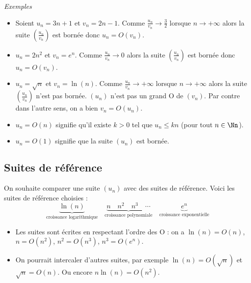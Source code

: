 \documentclass[11pt,class=report,crop=false]{standalone}
\begin{document}
\emph{Exemples} 
\begin{itemize}
	\item Soient $u_n = 3n+1$ et $v_n = 2n-1$. Comme $\frac{u_n}{v_n} \to \frac{3}{2}$ lorsque $n\to+\infty$ alors la suite $\left(\frac{u_n}{v_n}\right)$ est bornée donc $u_n = O(v_n)$.
	
	\item $u_n = 2n^2$ et $v_n = e^n$. Comme $\frac{u_n}{v_n} \to 0$ alors la suite $\left(\frac{u_n}{v_n}\right)$ est bornée donc $u_n = O(v_n)$. 
	
	\item $u_n = \sqrt{n}$ et $v_n = \ln(n)$. Comme $\frac{u_n}{v_n} \to +\infty$ lorsque $n\to+\infty$ alors la suite $\left(\frac{u_n}{v_n}\right)$ n'est pas bornée.  $(u_n)$ n'est pas un grand O de $(v_n)$.  Par contre dans l'autre sens, on a bien $v_n = O(u_n)$.
	
	\item $u_n = O(n)$ signifie qu'il existe $k>0$ tel que $u_n \le kn$ (pour tout $n\in\Nn$).
	
	\item $u_n = O(1)$ signifie que la suite $(u_n)$ est bornée.
		
\end{itemize}

\bigskip


\subsection{Suites de référence}


On souhaite comparer une suite $(u_n)$ avec des suites de référence. Voici les suites de référence choisies :
$$\underbrace{\ln(n)}_{\text{croissance logarithmique}} \quad \underbrace{n \quad  n^2 \quad n^3 \quad  \cdots}_{\text{croissance polynomiale}} \quad \underbrace{e^n}_{\text{croissance exponentielle}}$$

\begin{itemize}
	\item Les suites sont écrites en respectant l'ordre des O : on a $\ln(n) = O(n)$, $n=O(n^2)$, $n^2=O(n^3)$, $n^3 = O(e^n)$.
	
	\item On pourrait intercaler d'autres suites, par exemple $\ln(n) = O(\sqrt{n})$ et $\sqrt{n} = O(n)$.
	Ou encore $n\ln(n) = O(n^2)$.

\end{itemize}
\end{document}
